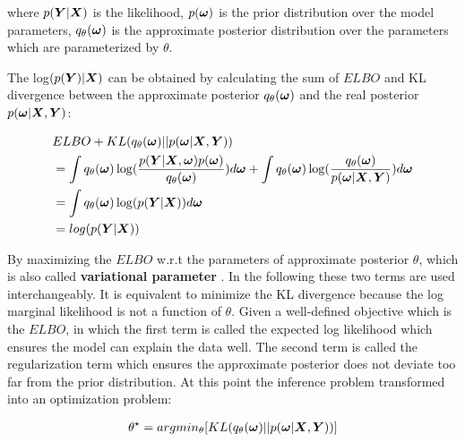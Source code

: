 where $p(\boldsymbol Y| \boldsymbol X)$ is the likelihood, $p(\boldsymbol \omega)$ is the prior distribution over the model parameters, $q_{\theta}(\boldsymbol \omega)$ is the approximate posterior distribution over the parameters which are parameterized by $\theta$.

The log$(p(\boldsymbol Y) | \boldsymbol X)$ can be obtained by calculating the sum of $ELBO$ and KL divergence between the approximate posterior $q_{\theta}(\boldsymbol \omega)$ and the real posterior $p(\boldsymbol \omega | \boldsymbol X, \boldsymbol Y)$:

\begin{equation}\label{2.7}	
\begin{aligned}
& ELBO + KL(q_{\theta}(\boldsymbol{\omega}) || p(\boldsymbol{\omega}|\boldsymbol{X}, \boldsymbol{Y})) \\ 
& = \int q_{\theta}(\boldsymbol{\omega}) \log( \frac{p(\boldsymbol{Y}| \boldsymbol{X}, \boldsymbol{\omega}) p(\boldsymbol{\omega})}{q_{\theta}(\boldsymbol{\omega})}) d\boldsymbol{\omega} + \int q_{\theta}(\boldsymbol{\omega}) \log(\frac{q_{\theta}(\boldsymbol{\omega})}{p(\boldsymbol{\omega}|\boldsymbol{X}, \boldsymbol{Y})}) d\boldsymbol{\omega} \\
& = \int q_{\theta}(\boldsymbol{\omega}) \log(p(\boldsymbol{Y} | \boldsymbol{X}))d\boldsymbol{\omega}\\
& = log(p(\boldsymbol{Y}|\boldsymbol{X})) 
\end{aligned}
\end{equation}


By maximizing the $ELBO$ w.r.t the parameters of approximate posterior $\theta$, which is also called \textbf{variational parameter} . 
In the following these two terms  are used interchangeably. It is equivalent to minimize the KL divergence because the log marginal likelihood is not a function of $\theta$. Given a well-defined objective which is the $ELBO$, in which the first term is called the expected log likelihood which ensures the model can explain the data well. The second term is called the regularization term which ensures the approximate posterior does not deviate too far from the prior distribution.
At this point the inference problem transformed into an optimization problem:

\begin{equation}\label{2.8}	
\begin{aligned}
\theta^{\star} = argmin_{\theta} [KL(q_{\theta}(\boldsymbol \omega)||p(\boldsymbol \omega | \boldsymbol X, \boldsymbol Y))]
\end{aligned}
\end{equation}

